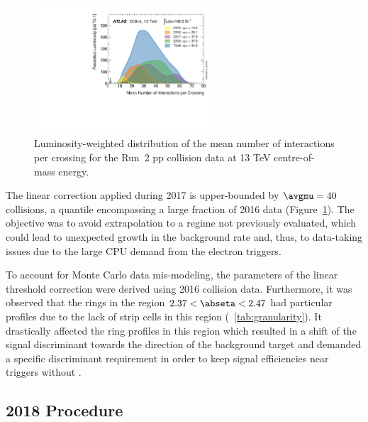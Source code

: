 








\begin{figure}[h!t]
\centering
\includegraphics[width=0.6\textwidth]{sections/tuning_strategy/figures/mu_2015_2018.pdf}
\caption{\label{fig:mu_2015_2018}
Luminosity-weighted distribution of the mean number of interactions per crossing
for the Run~2 pp collision data at 13 TeV centre-of-mass
energy.~\cite{atlas_lumi_run2_results}}
\end{figure}


The linear correction applied during 2017 is upper-bounded by $\avgmu=40$
collisions, a quantile encompassing a large fraction of 2016 data
(Figure~\ref{fig:mu_2015_2018}). The objective was to avoid extrapolation to a
regime not previously evaluated, which could lead to unexpected growth in the
background rate and, thus, to data-taking issues due to the large CPU demand
from the electron triggers.

To account for Monte Carlo data mis-modeling, the parameters of the linear threshold
correction were derived using 2016 collision data. Furthermore, it was observed
that the rings in the region $2.37<\abseta<2.47$ had particular profiles due to
the lack of strip cells in this region (\tablename~\ref{tab:granularity}). It
drastically affected the ring profiles in this region which resulted in a shift
of the signal discriminant towards the direction of the background target and
demanded a specific discriminant requirement in order to keep signal
efficiencies near triggers without \rnn{}.

\FloatBarrier
\subsection{2018 Procedure}\label{ssec:2018}

